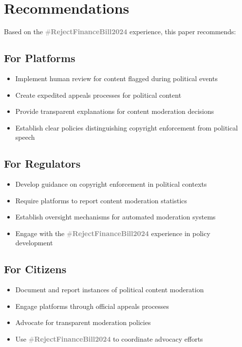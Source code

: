 \documentclass{article}
\newcommand{\rejectbill}{\textcolor{gray}{\#\textbf{RejectFinanceBill2024}}}
\begin{document}
\section{Recommendations}

Based on the \rejectbill{} experience, this paper recommends:

\subsection{For Platforms}

\begin{itemize}
\item Implement human review for content flagged during political events
\item Create expedited appeals processes for political content
\item Provide transparent explanations for content moderation decisions
\item Establish clear policies distinguishing copyright enforcement from political speech
\end{itemize}

\subsection{For Regulators}

\begin{itemize}
\item Develop guidance on copyright enforcement in political contexts
\item Require platforms to report content moderation statistics
\item Establish oversight mechanisms for automated moderation systems
\item Engage with the \rejectbill{} experience in policy development
\end{itemize}

\subsection{For Citizens}

\begin{itemize}
\item Document and report instances of political content moderation
\item Engage platforms through official appeals processes
\item Advocate for transparent moderation policies
\item Use \rejectbill{} to coordinate advocacy efforts
\end{itemize}
\end{document}
